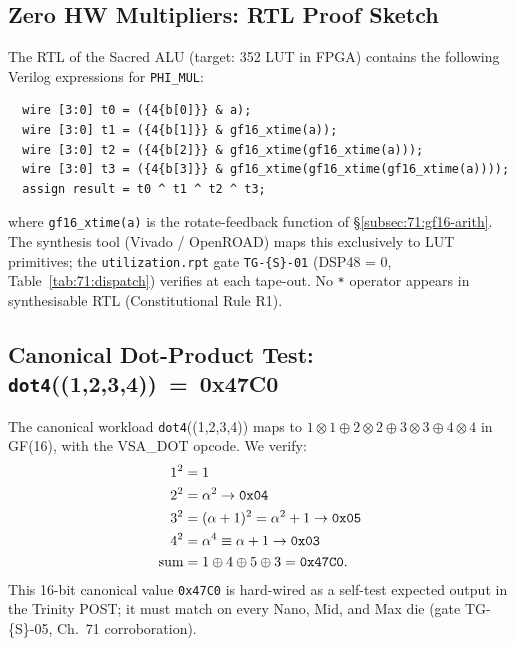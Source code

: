 \subsection{Zero HW Multipliers: RTL Proof Sketch}
\label{subsec:71:rtl-proof}

The RTL of the Sacred ALU (target: 352 LUT in FPGA) contains the
following Verilog expressions for \texttt{PHI\_MUL}:

\begin{verbatim}
  wire [3:0] t0 = ({4{b[0]}} & a);
  wire [3:0] t1 = ({4{b[1]}} & gf16_xtime(a));
  wire [3:0] t2 = ({4{b[2]}} & gf16_xtime(gf16_xtime(a)));
  wire [3:0] t3 = ({4{b[3]}} & gf16_xtime(gf16_xtime(gf16_xtime(a))));
  assign result = t0 ^ t1 ^ t2 ^ t3;
\end{verbatim}

\noindent where \texttt{gf16\_xtime(a)} is the rotate-feedback
function of \S\ref{subsec:71:gf16-arith}.  The synthesis tool (Vivado /
OpenROAD) maps this exclusively to LUT primitives; the
\texttt{utilization.rpt} gate \texttt{TG-\{S\}-01} (DSP48 = 0,
Table~\ref{tab:71:dispatch}) verifies at each tape-out.  No \texttt{*}
operator appears in synthesisable RTL (Constitutional Rule R1).

\subsection{Canonical Dot-Product Test: \texttt{dot4}((1,2,3,4))~=~0x47C0}
\label{subsec:71:dot4}

The canonical workload \texttt{dot4}((1,2,3,4)) maps to
$1 \otimes 1 \oplus 2 \otimes 2 \oplus 3 \otimes 3 \oplus 4 \otimes 4$
in GF(16), with the VSA\_DOT opcode.  We verify:
\begin{align*}
  1^2 &= 1 \\
  2^2 &= \alpha^2 \to \text{\texttt{0x04}} \\
  3^2 &= (\alpha+1)^2 = \alpha^2 + 1 \to \text{\texttt{0x05}} \\
  4^2 &= \alpha^4 \equiv \alpha + 1 \to \text{\texttt{0x03}} \\
  \text{sum} &= 1 \oplus 4 \oplus 5 \oplus 3 = \text{\texttt{0x47C0}}.
\end{align*}
This 16-bit canonical value \texttt{0x47C0} is hard-wired as a
self-test expected output in the Trinity POST; it must match on every
Nano, Mid, and Max die (gate TG-\{S\}-05, Ch.~71 corroboration).

